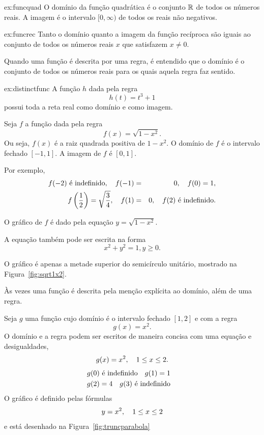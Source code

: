\begin{examplecont}{ex:funcquad}
O domínio da função quadrática é o conjunto $\mathbb{R}$ de todos os números
reais. A imagem é o intervalo $[0, \infty)$ de todos os reais não negativos.
\end{examplecont}

\begin{examplecont}{ex:funcrec}
Tanto o domínio quanto a imagem da função recíproca são iguais ao
conjunto de todos os números reais $x$ que satisfazem $x \ne 0$.
\end{examplecont}

Quando uma função é descrita por uma regra, é entendido que o domínio
é o conjunto de todos os números reais para os quais aquela regra faz
sentido.

\begin{examplecont}{ex:distinctfunc}
A função $h$ dada pela regra
\[
  h(t) = t^3 + 1
\]
possui toda a reta real como domínio e como imagem.
\end{examplecont}

\begin{example}
\label{ex:sqrt1x2}
Seja $f$ a função dada pela regra
\[
  f(x) = \sqrt{1 - x^2}.
\]
Ou seja, $f(x)$ é a raiz quadrada positiva de $1 - x^2$. O domínio
de $f$ é o intervalo fechado $[-1, 1]$. A imagem de $f$ é $[0, 1]$.

Por exemplo,
\begin{eqnarray*}
\textstyle
  f(-2) \text{ é indefinido}, \hspace{1em} f(-1) & = & 0, \hspace{1em} f(0) = 1, \\
  f\left(\frac{1}{2}\right) = \sqrt{\frac{3}{4}}, \hspace{1em} f(1) & = & 0,
                                   \hspace{1em} f(2) \text{ é indefinido}.
\end{eqnarray*}

O gráfico de $f$ é dado pela equação $y = \sqrt{1-x^2}$.

A equação também pode ser escrita na forma
\[
  x^2 + y^2 = 1, y \ge 0.
\]

O gráfico é apenas a metade superior do semicírculo unitário, mostrado
na Figura~\ref{fig:sqrt1x2}.
\end{example}


Às vezes uma função é descrita pela menção explícita ao domínio, além
de uma regra.

\begin{example}
Seja $g$ uma função cujo domínio é o intervalo fechado $[1, 2]$ e com
a regra
\[
  g(x) = x^2.
\]
O domínio e a regra podem ser escritos de maneira concisa com uma
equação e desigualdades,
\[
  g(x) = x^2, \hspace{1em} 1 \le x \le 2.
\]
\begin{eqnarray*}
   & g(0) \text{ é indefinido} \hspace{1em} g(1) = 1 & \\
   & g(2) = 4 \hspace{1em} g(3) \text{ é indefinido} &
\end{eqnarray*}
O gráfico é definido pelas fórmulas
\[
   y = x^2, \hspace{1em} 1 \le x \le 2
\]
e está desenhado na Figura~\ref{fig:truncparabola}
\end{example}

